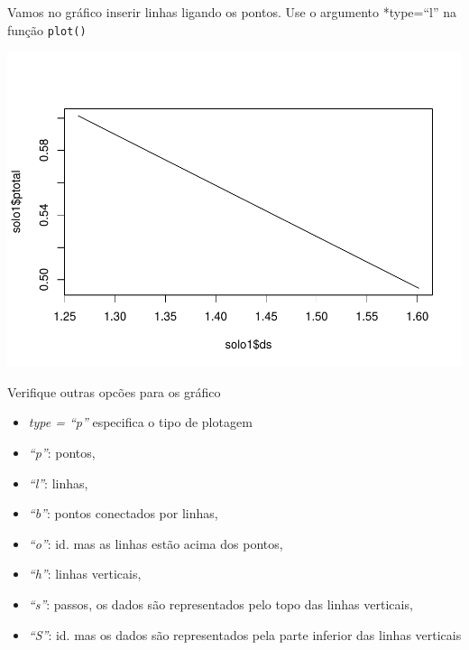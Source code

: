 \documentclass[]{book}
\newenvironment{Shaded}{\begin{snugshade}}{\end{snugshade}}
\newcommand{\DataTypeTok}[1]{\textcolor[rgb]{0.13,0.29,0.53}{#1}}
\newcommand{\KeywordTok}[1]{\textcolor[rgb]{0.13,0.29,0.53}{\textbf{#1}}}
\newcommand{\NormalTok}[1]{#1}
\newcommand{\OperatorTok}[1]{\textcolor[rgb]{0.81,0.36,0.00}{\textbf{#1}}}
\newcommand{\StringTok}[1]{\textcolor[rgb]{0.31,0.60,0.02}{#1}}
\providecommand{\tightlist}{%
  \setlength{\itemsep}{0pt}\setlength{\parskip}{0pt}}
\begin{document}
Vamos no gráfico inserir linhas ligando os pontos. Use o argumento *type=``l'' na função \texttt{plot()}

\begin{Shaded}
\end{Shaded}

\includegraphics{TudodoR_files/figure-latex/unnamed-chunk-153-1.pdf}

Verifique outras opcões para os gráfico

\begin{itemize}
\tightlist
\item
  \emph{type = ``p''} especifica o tipo de plotagem
\item
  \emph{``p''}: pontos,
\item
  \emph{``l''}: linhas,
\item
  \emph{``b''}: pontos conectados por linhas,
\item
  \emph{``o''}: id. mas as linhas estão acima dos pontos,
\item
  \emph{``h''}: linhas verticais,
\item
  \emph{``s''}: passos, os dados são representados pelo topo das linhas verticais,
\item
  \emph{``S''}: id. mas os dados são representados pela parte inferior das linhas verticais
\end{itemize}
\end{document}
